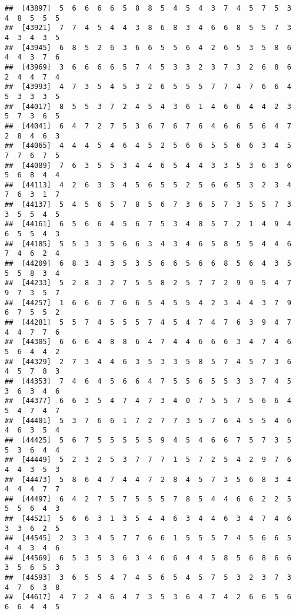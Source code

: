 \documentclass[
]{book}
\begin{document}
\begin{verbatim}
##  [43897]  5  6  6  6  6  5  8  8  5  4  5  4  3  7  4  5  7  5  3  4  8  5  5  5
##  [43921]  7  7  4  5  4  4  3  8  6  8  3  4  6  6  8  5  5  7  3  4  3  4  3  5
##  [43945]  6  8  5  2  6  3  6  6  5  5  6  4  2  6  5  3  5  8  6  4  4  3  7  6
##  [43969]  3  6  6  6  6  5  7  4  5  3  3  2  3  7  3  2  6  8  6  2  4  4  7  4
##  [43993]  4  7  3  5  4  5  3  2  6  5  5  5  7  7  4  7  6  6  4  5  3  3  3  5
##  [44017]  8  5  5  3  7  2  4  5  4  3  6  1  4  6  6  4  4  2  3  5  7  3  6  5
##  [44041]  6  4  7  2  7  5  3  6  7  6  7  6  4  6  6  5  6  4  7  2  8  4  6  3
##  [44065]  4  4  4  5  4  6  4  5  2  5  6  6  5  5  6  6  3  4  5  7  7  6  7  5
##  [44089]  7  6  3  5  5  3  4  4  6  5  4  4  3  3  5  3  6  3  6  5  6  8  4  4
##  [44113]  4  2  6  3  3  4  5  6  5  5  2  5  6  6  5  3  2  3  4  7  6  3  1  7
##  [44137]  5  4  5  6  5  7  8  5  6  7  3  6  5  7  3  5  5  7  3  3  5  5  4  5
##  [44161]  6  5  6  6  4  5  6  7  5  3  4  8  5  7  2  1  4  9  4  6  5  5  4  3
##  [44185]  5  5  3  3  5  6  6  3  4  3  4  6  5  8  5  5  4  4  6  7  4  6  2  4
##  [44209]  6  8  3  4  3  5  3  5  6  6  5  6  6  8  5  6  4  3  5  5  5  8  3  4
##  [44233]  5  2  8  3  2  7  5  5  8  2  5  7  7  2  9  9  5  4  7  9  7  3  5  7
##  [44257]  1  6  6  6  7  6  6  5  4  5  5  4  2  3  4  4  3  7  9  6  7  5  5  2
##  [44281]  5  5  7  4  5  5  5  7  4  5  4  7  4  7  6  3  9  4  7  4  4  7  7  6
##  [44305]  6  6  6  4  8  8  6  4  7  4  4  6  6  6  3  4  7  4  6  5  6  4  4  2
##  [44329]  2  7  3  4  4  6  3  5  3  3  5  8  5  7  4  5  7  3  6  4  5  7  8  3
##  [44353]  7  4  6  4  5  6  6  4  7  5  5  6  5  5  3  3  7  4  5  3  6  3  4  6
##  [44377]  6  6  3  5  4  7  4  7  3  4  0  7  5  5  7  5  6  6  4  5  4  7  4  7
##  [44401]  5  3  7  6  6  1  7  2  7  7  3  5  7  6  4  5  5  4  6  4  6  3  5  4
##  [44425]  5  6  7  5  5  5  5  5  9  4  5  4  6  6  7  5  7  3  5  5  3  6  4  4
##  [44449]  5  2  3  2  5  3  7  7  7  1  5  7  2  5  4  2  9  7  6  4  4  3  5  3
##  [44473]  5  8  6  4  7  4  4  7  2  8  4  5  7  3  5  6  8  3  4  4  4  4  7  7
##  [44497]  6  4  2  7  5  7  5  5  5  7  8  5  4  4  6  6  2  2  5  5  5  6  4  3
##  [44521]  5  6  6  3  1  3  5  4  4  6  3  4  4  6  3  4  7  4  6  3  3  6  2  5
##  [44545]  2  3  3  4  5  7  7  6  6  1  5  5  5  7  4  5  6  6  5  4  4  3  4  6
##  [44569]  6  5  3  5  3  6  3  4  6  6  4  4  5  8  5  6  8  6  6  3  5  6  5  3
##  [44593]  3  6  5  5  4  7  4  5  6  5  4  5  7  5  3  2  3  7  3  4  7  6  3  8
##  [44617]  4  7  2  4  6  4  7  3  5  3  6  4  7  4  2  6  6  5  6  6  6  4  4  5

\end{verbatim}
\end{document}
